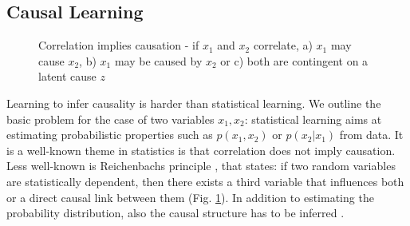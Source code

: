 	\subsection{Causal Learning}\label{sec:causallearning}
		\begin{figure}[htp]
			\begin{subfigure}{0.3\linewidth}
				\centering
				
				\caption{}
			\end{subfigure}
			\begin{subfigure}{0.3\linewidth}
				\centering
				
				\caption{}
			\end{subfigure}
			\begin{subfigure}{0.3\linewidth}
				\centering
				
				\caption{}
			\end{subfigure}
			\caption{Correlation implies causation - if $x_1$ and $x_2$ correlate, a) $x_1$ may cause $x_2$,  b) $x_1$ may be caused by $x_2$ or c) both are contingent on a latent cause $z$}
			\label{fig:reichenbach}
		\end{figure}

		Learning to infer causality is harder than statistical learning. We outline the basic problem for the case of two variables $x_1, x_2$: statistical learning aims at estimating probabilistic properties such as $p(x_1, x_2)$ or  $p(x_2|x_1)$ from data.
		It is a well-known theme in statistics is that correlation does not imply causation. Less well-known is Reichenbachs principle \cite{peters17elements, reichenbach56time}, that states: if two random variables are statistically dependent, then there exists a third variable that influences both or a direct causal link between them (Fig. \ref{fig:reichenbach}).
		In addition to estimating the probability distribution, also the causal structure has to be inferred \cite{peters17elements}.

